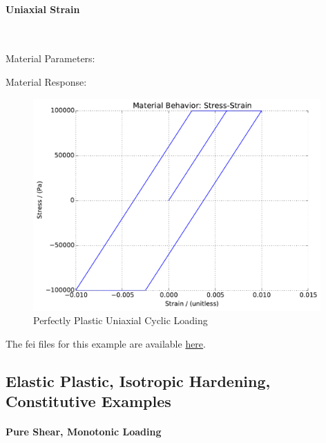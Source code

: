 \documentclass[fleqn,11pt]{article}
\begin{document}
\paragraph{Uniaxial Strain} ~

Material Parameters:


Material Response:
\begin{figure}[H]
\begin{center}
\includegraphics[width=11cm]{../fei_examples/perfectly_plastic/4uniaxial_strain_cyclic_loading/result.pdf}
\caption{
\label{Perfectly Plastic Uniaxial Cyclic Loading}
Perfectly Plastic Uniaxial Cyclic Loading}
\end{center}
\end{figure}

The fei files for this example are available \href{https://github.com/yuan-energy/education_examples/tree/master/fei_examples/perfectly_plastic/4uniaxial_strain_cyclic_loading}{here}.


\newpage
\subsection{Elastic Plastic, Isotropic Hardening, Constitutive Examples}

\paragraph{Pure Shear, Monotonic Loading} ~
\end{document}
